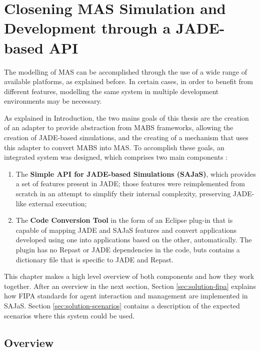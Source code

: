 \chapter{Closening MAS Simulation and Development through a JADE-based API}
\label{chap:solution}

The modelling of MAS can be accomplished through the use of a wide range of available platforms, as explained before. In certain cases, in order to benefit from different features, modelling the same system in multiple development environments may be necessary.

As explained in Introduction, the two mains goals of this thesis are the creation of an adapter to provide abstraction from MABS frameworks, allowing the creation of JADE-based simulations, and the creating of a mechanism that uses this adapter to convert MABS into MAS. To accomplish these goals, an integrated system was designed, which comprises two main components :

\begin{enumerate}
  \item The \textbf{Simple API for JADE-based Simulations (SAJaS)}, which provides a set of features present in JADE; those features were reimplemented from scratch in an attempt to simplify their internal complexity, preserving JADE-like external execution;
  \item The \textbf{Code Conversion Tool} in the form of an Eclipse plug-in that is capable of mapping JADE and SAJaS features and convert applications developed using one into applications based on the other, automatically. The plugin has no Repast or JADE dependencies in the code, buts contains a dictionary file that is specific to JADE and Repast.
\end{enumerate}

This chapter makes a high level overview of both components and how they work together. After an overview in the next section, Section \ref{sec:solution-fipa} explains how FIPA standards for agent interaction and management are implemented in SAJaS. Section \ref{sec:solution-scenarios} contains a description of the expected scenarios where this system could be used.

\section{Overview}
\label{sec:solution-overview}

